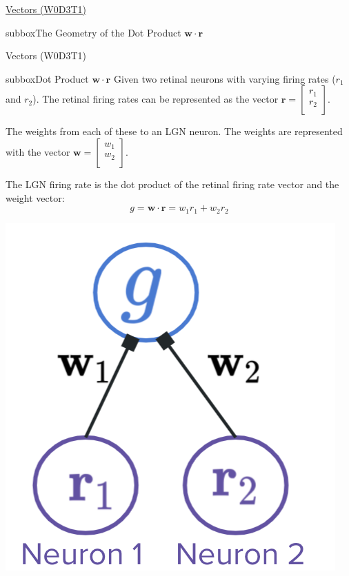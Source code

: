 \begin{multicols}{3}
\begin{textbox}{\href{https://compneuro.neuromatch.io/tutorials/W0D3_LinearAlgebra/student/W0D3_Tutorial1.html}{Vectors (W0D3T1) }}
\begin{subbox}{subbox}{The Geometry of the Dot Product $\mathbf{w}\cdot\mathbf{r}$}
\end{subbox}
\end{textbox}
\begin{textbox}{Vectors (W0D3T1) }
\begin{subbox}{subbox}{Dot Product $\mathbf{w}\cdot\mathbf{r}$}
\scriptsize
Given two retinal neurons with varying firing rates ($r_1$ and $r_2$).  The retinal firing rates can be represented as the vector $\mathbf{r} = \begin{bmatrix} r_1\\ r_2\\ \end{bmatrix}$.

The weights from each of these to an LGN neuron. The weights are represented with the vector $\mathbf{w} = \begin{bmatrix} w_1\\ w_2\\ \end{bmatrix}$.

The LGN firing rate is the dot product of the retinal firing rate vector and the weight vector:
\begin{equation}
g = \mathbf{w}\cdot\mathbf{r} = w_1r_1 + w_2r_2
\end{equation}

\centering
\includegraphics[scale=0.3]{Figures/PreCourse/Figure2.png}
\end{subbox}


\end{textbox}
\end{multicols}
